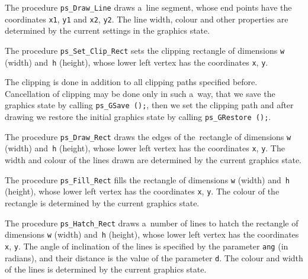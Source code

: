 \vspace{\bigskipamount}
The procedure \texttt{ps\_Draw\_Line} draws a~line segment, whose end points
have the coordinates \texttt{x1}, \texttt{y1} and \texttt{x2}, \texttt{y2}.
The line width, colour and other properties are determined by the current
settings in the graphics state.

\vspace{\bigskipamount}
The procedure \texttt{ps\_Set\_Clip\_Rect} sets the clipping rectangle
of dimensions \texttt{w} (width) and~\texttt{h} (height), whose lower
left vertex has the coordinates \texttt{x}, \texttt{y}.

The clipping is done in addition to all clipping paths specified before.
Cancellation of clipping may be done only in such a~way, that
we save the graphics state by calling \texttt{ps\_GSave~();},
then we set the clipping path and after drawing we restore the initial
graphics state by calling \texttt{ps\_GRestore~();}.

\vspace{\bigskipamount}
The procedure \texttt{ps\_Draw\_Rect} draws the edges of the~rectangle
of dimensions \texttt{w} (width) and~\texttt{h} (height), whose lower
left vertex has the coordinates \texttt{x}, \texttt{y}. The width and
colour of the lines drawn are determined by the current graphics state.

\vspace{\bigskipamount}
The procedure \texttt{ps\_Fill\_Rect} fills the rectangle of dimensions
\texttt{w} (width) and~\texttt{h} (height), whose lower left vertex
has the coordinates \texttt{x}, \texttt{y}. The colour of the
rectangle is determined by the current graphics state.

\vspace{\bigskipamount}
The procedure \texttt{ps\_Hatch\_Rect} draws a~number of lines to hatch
the rectangle of dimensions \texttt{w} (width) and~\texttt{h} (height),
whose lower left vertex has the coordinates \texttt{x}, \texttt{y}.
The angle of inclination of the lines is specified by the parameter
\texttt{ang} (in radians), and their distance is the value of the parameter
\texttt{d}. The colour and width of the lines is determined by the
current graphics state.


